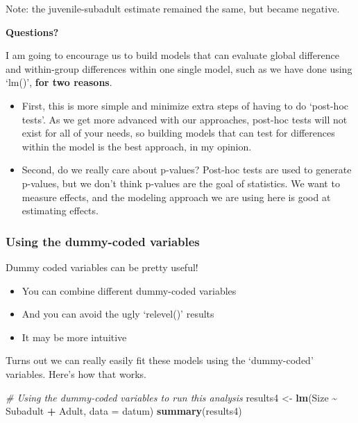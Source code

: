 \documentclass[
]{article}
\newenvironment{Shaded}{\begin{snugshade}}{\end{snugshade}}
\newcommand{\AttributeTok}[1]{\textcolor[rgb]{0.13,0.29,0.53}{#1}}
\newcommand{\CommentTok}[1]{\textcolor[rgb]{0.56,0.35,0.01}{\textit{#1}}}
\newcommand{\FunctionTok}[1]{\textcolor[rgb]{0.13,0.29,0.53}{\textbf{#1}}}
\newcommand{\NormalTok}[1]{#1}
\newcommand{\OtherTok}[1]{\textcolor[rgb]{0.56,0.35,0.01}{#1}}
\newcommand{\SpecialCharTok}[1]{\textcolor[rgb]{0.81,0.36,0.00}{\textbf{#1}}}
\providecommand{\tightlist}{%
  \setlength{\itemsep}{0pt}\setlength{\parskip}{0pt}}
\begin{document}
Note: the juvenile-subadult estimate remained the same, but became
negative.

\textbf{Questions?}

I am going to encourage us to build models that can evaluate global
difference and within-group differences within one single model, such as
we have done using `lm()', \textbf{for two reasons}.

\begin{itemize}
\tightlist
\item
  First, this is more simple and minimize extra steps of having to do
  `post-hoc tests'. As we get more advanced with our approaches,
  post-hoc tests will not exist for all of your needs, so building
  models that can test for differences within the model is the best
  approach, in my opinion.
\item
  Second, do we really care about p-values? Post-hoc tests are used to
  generate p-values, but we don't think p-values are the goal of
  statistics. We want to measure effects, and the modeling approach we
  are using here is good at estimating effects.
\end{itemize}

\subsubsection{Using the dummy-coded
variables}\label{using-the-dummy-coded-variables}

Dummy coded variables can be pretty useful!

\begin{itemize}
\tightlist
\item
  You can combine different dummy-coded variables
\item
  And you can avoid the ugly `relevel()' results
\item
  It may be more intuitive
\end{itemize}

Turns out we can really easily fit these models using the `dummy-coded'
variables. Here's how that works.

\begin{Shaded}
\begin{Highlighting}[]
\CommentTok{\# Using the dummy{-}coded variables to run this analysis}
\NormalTok{results4 }\OtherTok{\textless{}{-}} \FunctionTok{lm}\NormalTok{(Size }\SpecialCharTok{\textasciitilde{}}\NormalTok{ Subadult }\SpecialCharTok{+}\NormalTok{ Adult, }\AttributeTok{data =}\NormalTok{ datum)}
\FunctionTok{summary}\NormalTok{(results4)}
\end{Highlighting}
\end{Shaded}
\end{document}
